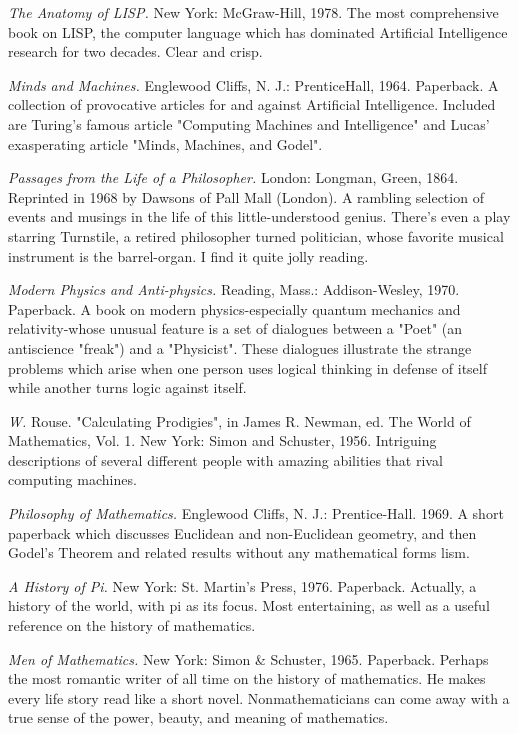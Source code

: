  {\sl The Anatomy of LISP.} New York: McGraw-Hill, 1978. The most comprehensive book on LISP, the computer language which has dominated Artificial Intelligence research for two decades. Clear and crisp.

 {\sl Minds and Machines.} Englewood Cliffs, N. J.: PrenticeHall, 1964. Paperback. A collection of provocative articles for and against Artificial Intelligence. Included are Turing's famous article "Computing Machines and Intelligence" and Lucas' exasperating article "Minds, Machines, and Godel".

 {\sl Passages from the Life of a Philosopher.} London: Longman, Green, 1864. Reprinted in 1968 by Dawsons of Pall Mall (London). A rambling selection of events and musings in the life of this little-understood genius. There's even a play starring Turnstile, a retired philosopher turned politician, whose favorite musical instrument is the barrel-organ. I find it quite jolly reading.

 {\sl Modern Physics and Anti-physics.} Reading, Mass.: Addison-Wesley, 1970. Paperback. A book on modern physics-especially quantum mechanics and relativity-whose unusual feature is a set of dialogues between a "Poet" (an antiscience "freak") and a "Physicist". These dialogues illustrate the strange problems which arise when one person uses logical thinking in defense of itself while another turns logic against itself.

 {\sl W.} Rouse. "Calculating Prodigies", in James R. Newman, ed. The World of Mathematics, Vol. 1. New York: Simon and Schuster, 1956. Intriguing descriptions of several different people with amazing abilities that rival computing machines.

 {\sl Philosophy of Mathematics.} Englewood Cliffs, N. J.: Prentice-Hall. 1969. A short paperback which discusses Euclidean and non-Euclidean geometry, and then Godel's Theorem and related results without any mathematical forms lism.

 {\sl A History of Pi.} \llap{*\enspace}New York: St. Martin's Press, 1976. Paperback. Actually, a history of the world, with pi as its focus. Most entertaining, as well as a useful reference on the history of mathematics.

 {\sl Men of Mathematics.} \llap{*\enspace}New York: Simon \& Schuster, 1965. Paperback. Perhaps the most romantic writer of all time on the history of mathematics. He makes every life story read like a short novel. Nonmathematicians can come away with a true sense of the power, beauty, and meaning of mathematics.

